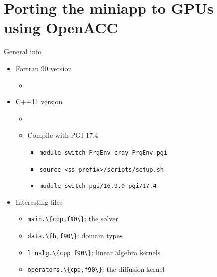\documentclass[12pt,aspectratio=169]{beamer}
\newcommand\shinline[2][]{\lstinline[style=shstyle,basicstyle=\ttfamily,#1]!#2!}
\begin{document}
\part{Porting the miniapp to GPUs using OpenACC}

\begin{frame}[fragile]{General info}
  \begin{itemize}
  \item Fortran 90 version
    \begin{itemize}
    \item {}
    \end{itemize}
  \item C++11 version
    \begin{itemize}
    \item {}
    \item Compile with PGI 17.4
      \begin{itemize}
        \item\shinline{module switch PrgEnv-cray PrgEnv-pgi}
        \item\shinline{source <ss-prefix>/scripts/setup.sh}
        \item\shinline{module switch pgi/16.9.0 pgi/17.4}
      \end{itemize}
    \end{itemize}
  \item Interesting files
    \begin{itemize}
    \item\shinline{main.\{cpp,f90\}}: the solver
    \item\shinline{data.\{h,f90\}}: domain types
    \item\shinline{linalg.\{cpp,f90\}}: linear algebra kernels
    \item\shinline{operators.\{cpp,f90\}}: the diffusion kernel
    \end{itemize}
  \end{itemize}
\end{frame}
\end{document}

